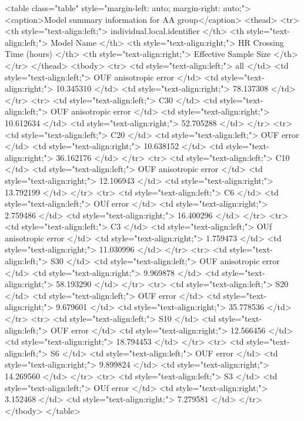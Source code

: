 <table class="table" style="margin-left: auto; margin-right: auto;">
<caption>Model summary information for AA group</caption>
 <thead>
  <tr>
   <th style="text-align:left;"> individual.local.identifier </th>
   <th style="text-align:left;"> Model Name </th>
   <th style="text-align:right;"> HR Crossing Time (hours) </th>
   <th style="text-align:right;"> Effective Sample Size </th>
  </tr>
 </thead>
<tbody>
  <tr>
   <td style="text-align:left;"> all </td>
   <td style="text-align:left;"> OUF anisotropic error </td>
   <td style="text-align:right;"> 10.345310 </td>
   <td style="text-align:right;"> 78.137308 </td>
  </tr>
  <tr>
   <td style="text-align:left;"> C30 </td>
   <td style="text-align:left;"> OUF anisotropic error </td>
   <td style="text-align:right;"> 10.612634 </td>
   <td style="text-align:right;"> 52.705288 </td>
  </tr>
  <tr>
   <td style="text-align:left;"> C20 </td>
   <td style="text-align:left;"> OUF error </td>
   <td style="text-align:right;"> 10.638152 </td>
   <td style="text-align:right;"> 36.162176 </td>
  </tr>
  <tr>
   <td style="text-align:left;"> C10 </td>
   <td style="text-align:left;"> OUF anisotropic error </td>
   <td style="text-align:right;"> 12.106943 </td>
   <td style="text-align:right;"> 13.792199 </td>
  </tr>
  <tr>
   <td style="text-align:left;"> C6 </td>
   <td style="text-align:left;"> OUf error </td>
   <td style="text-align:right;"> 2.759486 </td>
   <td style="text-align:right;"> 16.400296 </td>
  </tr>
  <tr>
   <td style="text-align:left;"> C3 </td>
   <td style="text-align:left;"> OUf anisotropic error </td>
   <td style="text-align:right;"> 1.759473 </td>
   <td style="text-align:right;"> 11.030996 </td>
  </tr>
  <tr>
   <td style="text-align:left;"> S30 </td>
   <td style="text-align:left;"> OUF anisotropic error </td>
   <td style="text-align:right;"> 9.969878 </td>
   <td style="text-align:right;"> 58.193290 </td>
  </tr>
  <tr>
   <td style="text-align:left;"> S20 </td>
   <td style="text-align:left;"> OUF error </td>
   <td style="text-align:right;"> 9.679601 </td>
   <td style="text-align:right;"> 35.778536 </td>
  </tr>
  <tr>
   <td style="text-align:left;"> S10 </td>
   <td style="text-align:left;"> OUF error </td>
   <td style="text-align:right;"> 12.566456 </td>
   <td style="text-align:right;"> 18.794453 </td>
  </tr>
  <tr>
   <td style="text-align:left;"> S6 </td>
   <td style="text-align:left;"> OUF error </td>
   <td style="text-align:right;"> 9.899824 </td>
   <td style="text-align:right;"> 14.269560 </td>
  </tr>
  <tr>
   <td style="text-align:left;"> S3 </td>
   <td style="text-align:left;"> OUf error </td>
   <td style="text-align:right;"> 3.152468 </td>
   <td style="text-align:right;"> 7.279581 </td>
  </tr>
</tbody>
</table>